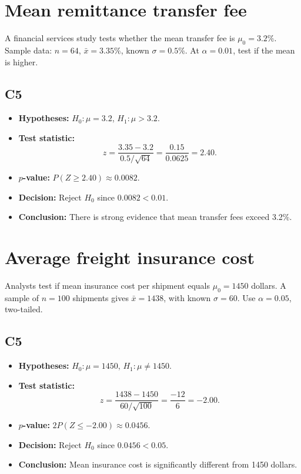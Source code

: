 \begin{ExamProblems}
\item
\section{Mean remittance transfer fee}
A financial services study tests whether the mean transfer fee is \(\mu_0=3.2\%\). Sample data: \(n=64\), \(\bar x=3.35\%\), known \(\sigma=0.5\%\). At \(\alpha=0.01\), test if the mean is higher.

\subsection*{C5}
\begin{itemize}
    \item \textbf{Hypotheses:} \(H_0\colon \mu=3.2\), \(H_1\colon \mu>3.2\).
    \item \textbf{Test statistic:}
    \[
    z=\frac{3.35-3.2}{0.5/\sqrt{64}}=\frac{0.15}{0.0625}=2.40.
    \]
    \item \textbf{\(p\)-value:} \(P(Z\ge 2.40)\approx 0.0082\).
    \item \textbf{Decision:} Reject \(H_0\) since \(0.0082<0.01\).
    \item \textbf{Conclusion:} There is strong evidence that mean transfer fees exceed 3.2\%.
\end{itemize}

\item
\section{Average freight insurance cost}
Analysts test if mean insurance cost per shipment equals \(\mu_0=1450\) dollars. A sample of \(n=100\) shipments gives \(\bar x=1438\), with known \(\sigma=60\). Use \(\alpha=0.05\), two-tailed.

\subsection*{C5}
\begin{itemize}
    \item \textbf{Hypotheses:} \(H_0\colon \mu=1450\), \(H_1\colon \mu\ne 1450\).
    \item \textbf{Test statistic:}
    \[
    z=\frac{1438-1450}{60/\sqrt{100}}=\frac{-12}{6}=-2.00.
    \]
    \item \textbf{\(p\)-value:} \(2P(Z\le -2.00)\approx 0.0456\).
    \item \textbf{Decision:} Reject \(H_0\) since \(0.0456<0.05\).
    \item \textbf{Conclusion:} Mean insurance cost is significantly different from 1450 dollars.
\end{itemize}


\end{ExamProblems}
